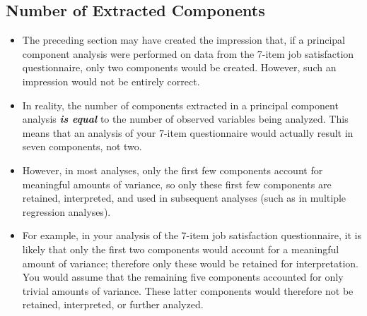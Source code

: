 \subsection{Number of Extracted Components}
\begin{itemize}
	\item The preceding section may have created the impression
	that, if a principal component analysis were performed on data from the 7-item job satisfaction
	questionnaire, only two components would be created.  However, such an impression would not
	be entirely correct.
	
\item In reality, the number of components extracted in a principal component analysis \textbf{\emph{is equal}} to the
	number of observed variables being analyzed.  This means that an analysis of your 7-item
	questionnaire would actually result in seven components, not two.
	
\item 	However, in most analyses, only the first few components account for meaningful amounts of
	variance, so only these first few components are retained, interpreted, and used in subsequent
	analyses (such as in multiple regression analyses).  
	
\item For example, in your analysis of the 7-item
	job satisfaction questionnaire, it is likely that only the first two components would account for a
	meaningful amount of variance; therefore only these would be retained for interpretation.  You
	would assume that the remaining five components accounted for only trivial amounts of
	variance.  These latter components would therefore not be retained, interpreted, or further
	analyzed.
\end{itemize}

